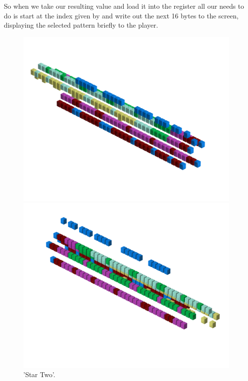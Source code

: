 So when we take our resulting value and load it into the  register all our  needs to do is start at the 
index given by  and write out the next 16 bytes to the screen, displaying the selected pattern briefly to the player.
\clearpage
\rhead[]{\leftmark}
\begin{minipage}[b]{0.48\linewidth}
\begin{figure}[H]
    \centering
    \begin{adjustbox}{width=6cm,margin=0cm 0cm}
      \includegraphics[width=12cm]{src/patterns/pattern3-45.png}%
    \end{adjustbox}
    \begin{adjustbox}{width=6cm,margin=0cm -1.8cm}
      \includegraphics[width=12cm]{src/patterns/pattern3-225.png}%
    \end{adjustbox}
\caption{'Star Two'.}
\end{figure}
\end{minipage}
